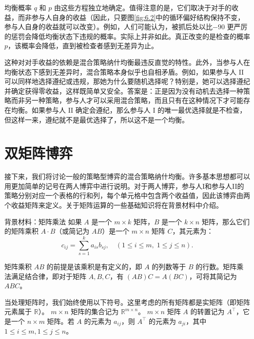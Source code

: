 均衡概率 \(q\) 和 \(p\) 由这些方程独立地确定。值得注意的是，它们取决于对手的收益，而非参与人自身的收益（因此，只要图\ref{fig:6.2}中的循环偏好结构保持不变，参与人自身的收益就可以改变）。例如，人们可能认为，被抓后处以比$ -90$ 更严厉的惩罚会降低均衡状态下违规的概率。实际上并非如此。真正改变的是检查的概率 \(p\)，该概率会降低，直到被检查者感到无差异为止。

这种对对手收益的依赖是混合策略纳什均衡最违反直觉的特性。此外，当参与人在均衡状态下感到无差异时，混合策略本身似乎也自相矛盾。例如，如果参与人 II 可以同样地选择遵纪或违规，那她为什么要随机选择呢？特别是，她可以选择遵纪并确定获得零收益，这样既简单又安全。答案是：正是因为没有动机去选择一种策略而非另一种策略，参与人才可以采用混合策略，而且只有在这种情况下才可能存在均衡。如果参与人 II 确定会遵纪，那么参与人 I 的唯一最优选择就是不检查，但这样一来，遵纪就不是最优选择了，所以这不是一个均衡。

\section{双矩阵博弈}   \label{sec6.3}

接下来，我们将讨论一般的策略型博弈的混合策略纳什均衡。许多基本思想都可以用更加简单的记号在两人博弈中进行说明。对于两人博弈，参与人I和参与人II的策略分别对应一个表格的行和列，每个单元格中包含两个收益值，因此该博弈由两个收益矩阵来定义。关于矩阵运算的一些基础知识将在背景材料中介绍。


\begin{mybox}{背景材料：矩阵乘法}
\setlength{\parindent}{2em} 
如果 \(A\) 是一个 \(m \times  k\) 矩阵，\(B\) 是一个 \(k \times  n\) 矩阵，那么它们的矩阵乘积 \(A \cdot  B\)（或简记为 \({AB}\)）是一个 \(m \times  n\) 矩阵 \(C\)，其元素为：
\begin{equation}\label{eq:6.1}
c_{ij} = \sum_{s=1}^{k} a_{is} b_{sj}, \quad 
(1 \le i \le m, \; 1 \le j \le n).
\end{equation}

矩阵乘积 \({AB}\) 的前提是该乘积是有定义的，即 \(A\) 的列数等于 \(B\) 的行数。矩阵乘法满足结合律，即对于矩阵 \(A,B,C\)，有 \(\left( {AB}\right) C = A\left( {BC}\right)\)，可将其简记为 \({ABC}\)。
\end{mybox}

当处理矩阵时，我们始终使用以下符号。这里考虑的所有矩阵都是实矩阵（即矩阵元素属于 \(\mathbb{R}\)）。 \(m \times  n\) 矩阵的集合记为 \({\mathbb{R}}^{m \times  n}\)。 \(m \times  n\) 矩阵 \(A\) 的转置记为 \({A}^{\top }\)，它是一个 \(n \times  m\) 矩阵。若 \(A\) 的元素为 \({a}_{ij}\)，则 \({A}^{\top }\) 的元素为 \({a}_{ji}\)，其中 \(1 \leq  i \leq  m,1 \leq  j \leq  n\)。

